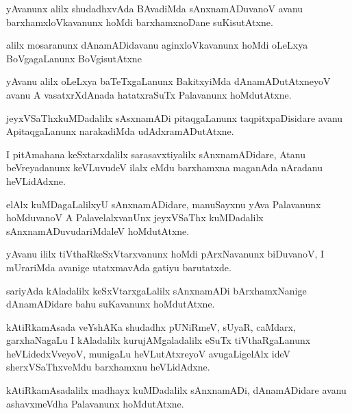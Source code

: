 \documentclass{article}
\begin{document}
\begin{mn}
yAvanunx  alilx  shudadhxvAda  BAvadiMda  sAnxnamADuvanoV  avanu  
barxhamxloVkavanunx  hoMdi  barxhamxnoDane  suKisutAtxne.
\end{mn}

\begin{mn}
alilx  mosaranunx  dAnamADidavanu  aginxloVkavanunx  hoMdi  oLeLxya  
BoVgagaLanunx  BoVgisutAtxne
\end{mn}

\begin{mn}
yAvanu  alilx  oLeLxya  baTeTxgaLanunx  BakitxyiMda  dAnamADutAtxneyoV 
 avanu  A  vasatxrXdAnada  hatatxraSuTx  Palavanunx  hoMdutAtxne.
\end{mn}

\begin{mn}
jeyxVSaThxkuMDadalilx  sAsxnamADi  pitaqgaLanunx  taqpitxpaDisidare  avanu  
ApitaqgaLanunx  narakadiMda  udAdxramADutAtxne.
\end{mn}

\begin{mn}
I pitAmahana  keSxtarxdalilx  sarasavxtiyalilx  sAnxnamADidare,  Atanu  beVreyadanunx  
keVLuvudeV  ilalx  eMdu  barxhamxna  maganAda  nAradanu  heVLidAdxne.
\end{mn}

\begin{mn}
elAlx  kuMDagaLalilxyU  sAnxnamADidare,  manuSayxnu  yAva Palavanunx  hoMduvanoV  
A  PalavelalxvanUnx  jeyxVSaThx  kuMDadalilx  sAnxnamADuvudariMdaleV  hoMdutAtxne.
\end{mn}

\begin{mn}
yAvanu  ililx  tiVthaRkeSxVtarxvanunx  hoMdi  pArxNavanunx  biDuvanoV,  
I  mUrariMda  avanige  utatxmavAda  gatiyu  barutatxde. 
\end{mn}

\begin{mn}
sariyAda  kAladalilx  keSxVtarxgaLalilx  sAnxnamADi  bArxhamxNanige  
dAnamADidare  bahu  suKavanunx  hoMdutAtxne.
\end{mn}

\begin{mn}
kAtiRkamAsada  veYshAKa  shudadhx  pUNiRmeV,  sUyaR,  caMdarx,  garxhaNagaLu  I  
kAladalilx  kurujAMgaladalilx  eSuTx  tiVthaRgaLanunx  heVLidedxVveyoV,  munigaLu  
heVLutAtxreyoV  avugaLigelAlx  ideV  sherxVSaThxveMdu  barxhamxnu  heVLidAdxne.
\end{mn}

\begin{mn}
kAtiRkamAsadalilx  madhayx kuMDadalilx  sAnxnamADi,  dAnamADidare  avanu  
ashavxmeVdha  Palavanunx  hoMdutAtxne.
\end{mn}
\end{document}
